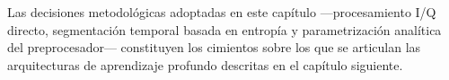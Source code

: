 Las decisiones metodológicas adoptadas en este capítulo —procesamiento I/Q directo, segmentación temporal basada en entropía y parametrización analítica del preprocesador— constituyen los cimientos sobre los que se articulan las arquitecturas de aprendizaje profundo descritas en el capítulo siguiente.
